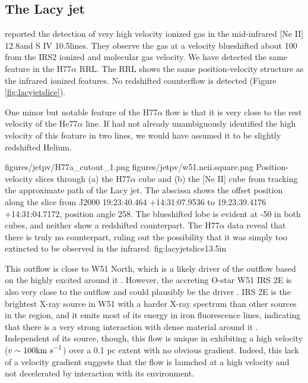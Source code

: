 \subsection{The Lacy jet}
\label{sec:lacyjet}
\citet{Lacy2007a} reported the detection of very high velocity ionized gas
in the mid-infrared [Ne II] 12.8\um and S IV 10.5\um lines.  They observe the
gas at a velocity blueshifted about 100 \kms from the IRS2 ionized and molecular
gas velocity.  We have detected the same feature in the H77$\alpha$ RRL.
The RRL shows the same position-velocity structure as the infrared ionized
features.  No redshifted counterflow is detected (Figure \ref{fig:lacyjetslice}).

One minor but notable feature of the H77$\alpha$ flow is that it is very close
to the rest velocity of the He77$\alpha$ line.  If \citet{Lacy2007a} had not
already unambiguously identified the high velocity of this feature in two
lines, we would have assumed it to be slightly redshifted Helium.

\FigureTwo
{figures/jetpv/H77a_cutout_1.png}
{figures/jetpv/w51.neii.square.png}
{Position-velocity slices through (a) the H77$\alpha$ cube and (b) the [Ne II]
cube from \citet{Lacy2007a} tracking the approximate path of the Lacy jet.  The
abscissa shows the offset position along the slice from J2000 19:23:40.464
+14:31:07.9536 to 19:23:39.4176 +14:31:04.7172, position angle 258\arcdeg.
The blueshifted lobe is evident at -50 \kms in both cubes, and neither show a
redshifted counterpart.  The H77$\alpha$ data reveal that there is truly no
counterpart, ruling out the possibility that it was simply too extincted to be
observed in the infrared.}
{fig:lacyjetslice}{1}{3.5in}

This outflow is close to W51 North, which is a likely driver of the outflow based
on the highly excited \ammonia around it \citep{Henkel2013a,Goddi2015a}.  However,
the accreting O-star W51 IRS 2E is also very close to the outflow and could plausibly
be the driver \citep{Barbosa2008a}.  IRS 2E is the brightest X-ray source in
W51 with a harder X-ray spectrum than other sources in the region, and it emits
most of its energy in iron fluorescence lines, indicating that there is a very
strong interaction with dense material around it \citep{Townsley2014a}.
Independent of its source, though, this flow is unique in exhibiting a high
velocity ($v\sim100 \textrm{km~s}^{-1}$) over a 0.1 pc extent with no obvious gradient.
Indeed, this lack of a velocity gradient suggests that the flow is launched
at a high velocity and not decelerated by interaction with its environment.


